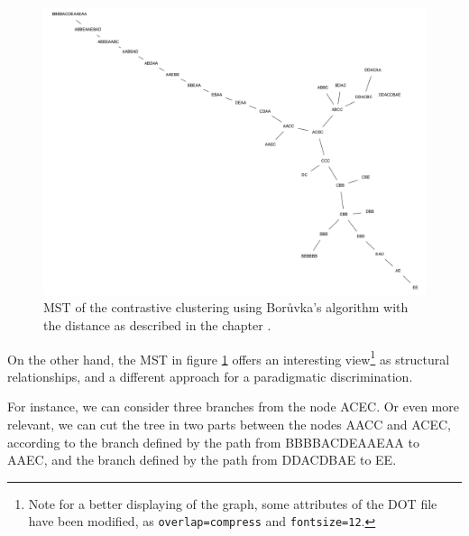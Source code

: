 \begin{figure}[!hbt]
	\begin{center}
		\includegraphics[width=\columnwidth]{img/mst2}
		\caption{MST of the contrastive clustering using Bor\r{u}vka's algorithm with the distance as described in the chapter \textsl{}.}
		\label{fig:mst2}
	\end{center}
\end{figure}

On the other hand, the MST in figure \ref{fig:mst2} offers an interesting view\footnote{Note for a better displaying of the graph, some attributes of the DOT file have been modified, as \texttt{overlap=compress} and \texttt{fontsize=12}.} as structural relationships, and a different approach for a paradigmatic discrimination. 

\smallskip

For instance, we can consider three branches from the node \textsf{ACEC}. Or even more relevant, we can cut the tree in two parts between the nodes \textsf{AACC} and \textsf{ACEC}, according to the branch defined by the path from \textsf{BBBBACDEAAEAA} to \textsf{AAEC}, and the branch defined by the path from \textsf{DDACDBAE} to \textsf{EE}.